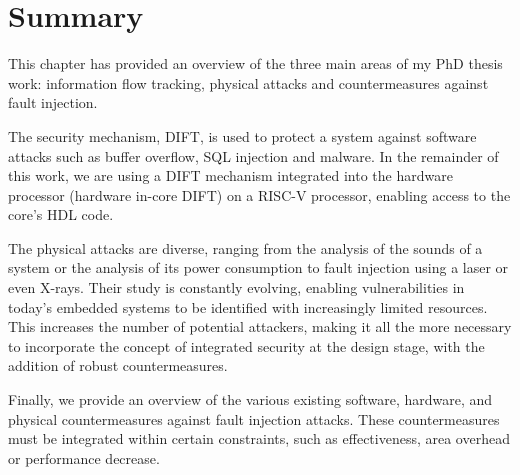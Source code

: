 \section{Summary}
This chapter has provided an overview of the three main areas of my PhD thesis work: information flow tracking, physical attacks and countermeasures against fault injection.

The security mechanism, DIFT, is used to protect a system against software attacks such as buffer overflow, SQL injection and malware. In the remainder of this work, we are using a DIFT mechanism integrated into the hardware processor (hardware in-core DIFT) on a RISC-V processor, enabling access to the core's HDL code.

The physical attacks are diverse, ranging from the analysis of the sounds of a system or the analysis of its power consumption to fault injection using a laser or even X-rays. Their study is constantly evolving, enabling vulnerabilities in today's embedded systems to be identified with increasingly limited resources. This increases the number of potential attackers, making it all the more necessary to incorporate the concept of integrated security at the design stage, with the addition of robust countermeasures.

Finally, we provide an overview of the various existing software, hardware, and physical countermeasures against fault injection attacks. These countermeasures must be integrated within certain constraints, such as effectiveness, area overhead or performance decrease.

